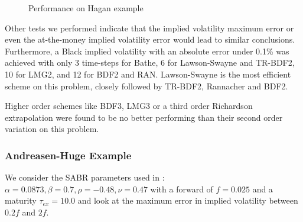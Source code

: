 \documentclass[]{rAMF2e}
\begin{document}
\begin{figure}[htb]
  \begin{center}  
    \end{center}
     \caption{\label{fig:perf_hagan_500} Performance on Hagan example}
\end{figure}

Other tests we performed indicate that the implied volatility maximum error or even the at-the-money implied volatility error would lead to similar conclusions. Furthermore, a Black implied volatility with an absolute error under 0.1\% was achieved with only 3 time-steps for Bathe, 6 for Lawson-Swayne and TR-BDF2, 10 for LMG2, and 12 for BDF2 and RAN. Lawson-Swayne is the most efficient scheme on this problem, closely followed by TR-BDF2, Rannacher and BDF2.

Higher order schemes like BDF3, LMG3 or a third order Richardson extrapolation were found to be no better performing than their second order variation on this problem.

\subsubsection{Andreasen-Huge Example}
We consider the SABR parameters used in \citep{andreasen2011zabr}: $\alpha=0.0873, \beta=0.7, \rho=-0.48, \nu=0.47$ with a forward of $f=0.025$ and a maturity $\tau_{ex}=10.0$ and look at the maximum error in implied volatility between $0.2f$ and $2f$.
\end{document}
